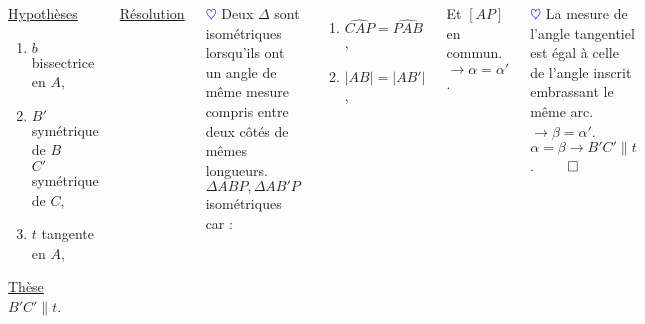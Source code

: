\documentclass[10pt]{beamer}
\def \heart {\textcolor{blue}{$\heartsuit$} }
\begin{document}
{\begin{columns}[t]
\begin{tcolorbox}[basic]
				    \smallskip
				    \underline{Hypothèses} 
				    \begin{enumerate}
				    \item $b$ bissectrice en $A$,
				    \item $B'$ symétrique de $B$ \\
					  $C'$ symétrique de $C$,
				    \item $t$ tangente en $A$,
				    \end{enumerate}
							      
				    \underline{Thèse} \\
				    \smallskip
				    $B'C' \parallel t $.
				    \end{tcolorbox}
		
		
		\centering
		
		\underline{Résolution}\\ \flushleft
		
		\heart Deux $\Delta$ sont isométriques lorsqu'ils ont un angle de même mesure compris entre deux côtés de mêmes longueurs. \\ \medskip
		$\Delta ABP, \Delta AB'P$ isométriques car :
		\begin{enumerate}
		 \item $\widehat{CAP}=\widehat{PAB}$,
		 \item $|AB|=|AB'|$,
		\end{enumerate} \smallskip
		
		 Et $[AP]$ en commun. \\ \smallskip
		 $\rightarrow \alpha = \alpha '$. \\ \medskip
		 
		 \heart La mesure de l'angle tangentiel est égal à celle de l'angle inscrit embrassant le même arc. \\ \smallskip
		 $\rightarrow \beta = \alpha '$. \\ \medskip
		 $\alpha = \beta \rightarrow B'C' \parallel t$. \hfill $\qed$ \\ 
		 
		 
		 
		 
		
		
		

   
	   \end{columns}
    
    
    
    }
	  
  
\end{document}
